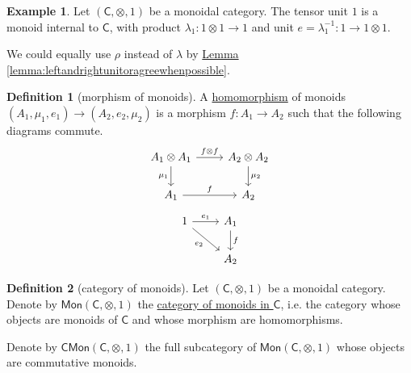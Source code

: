\documentclass[a4paper]{report}
\newcommand{\defn}[1]{\ul{#1}}
\theoremstyle{definition}
\newtheorem{definition}{Definition}[section]
\newtheorem{example}{Example}[section]
\theoremstyle{plain}
\theoremstyle{remark}
\begin{document}
\begin{example}
  \label{eg:tensorunitisinternalmonoid}
  Let $(\mathsf{C}, \otimes, 1)$ be a monoidal category. The tensor unit $1$ is a monoid internal to $\mathsf{C}$, with product $\lambda_{1}\colon 1 \otimes 1 \to 1$ and unit $e = \lambda^{-1}_{1}\colon 1 \to 1 \otimes 1$.

  We could equally use $\rho$ instead of $\lambda$ by \hyperref[lemma:leftandrightunitoragreewhenpossible]{Lemma \ref*{lemma:leftandrightunitoragreewhenpossible}}.
\end{example}

\begin{definition}[morphism of monoids]
  \label{def:homomorphismofmonoids}
  A \defn{homomorphism} of monoids $(A_{1}, \mu_{1}, e_{1}) \to (A_{2}, e_{2}, \mu_{2})$ is a morphism $f\colon A_{1} \to A_{2}$ such that the following diagrams commute.
  \begin{equation*}
    \begin{tikzcd}
      A_{1} \otimes A_{1}
      \arrow[r, "f \otimes f"]
      \arrow[d, swap, "\mu_{1}"]
      & A_{2} \otimes A_{2}
      \arrow[d, "\mu_{2}"]
      \\
      A_{1} 
      \arrow[r, "f"]
      & A_{2}
    \end{tikzcd}
  \end{equation*}
  \begin{equation*}
    \begin{tikzcd}
      1
      \arrow[r, "e_{1}"]
      \arrow[rd, swap, "e_{2}"]
      & A_{1}
      \arrow[d, "f"]
      \\
      & A_{2}
    \end{tikzcd}
  \end{equation*}
\end{definition}

\begin{definition}[category of monoids]
  \label{def:categoryofmonoids}
  Let $(\mathsf{C}, \otimes, 1)$ be a monoidal category. Denote by $\mathsf{Mon}(\mathsf{C}, \otimes, 1)$ the \defn{category of monoids in $\mathsf{C}$}, i.e. the category whose objects are monoids of $\mathsf{C}$ and whose morphism are homomorphisms.

  Denote by $\mathsf{CMon}(\mathsf{C}, \otimes, 1)$ the full subcategory of $\mathsf{Mon}(\mathsf{C}, \otimes, 1)$ whose objects are commutative monoids.
\end{definition}
\end{document}
